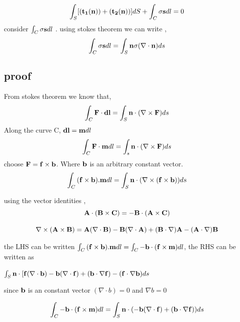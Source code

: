 \documentclass{article}
\begin{document}
\begin{equation}
\label{force balance}
\int_S [{\bf(t_{1}(n))} + {\bf(t_{2}(n))}] dS + \int_C \sigma {\bf s} dl = 0 
\end{equation}
consider $\int_C \sigma {\bf s} dl $ . using stokes theorem we can write ,
\begin{equation}
\int_C \sigma {\bf s} dl = \int_S {\bf n\sigma(\nabla \cdot {\bf n}})ds 
\end{equation}
\subsection*{\bf proof}
From stokes theorem we know that,
\begin{equation*}
\int_C {\bf F \cdot dl} = \int_S {\bf n \cdot (\nabla \times F)}ds
\end{equation*} 
Along the curve C, $ {\bf dl} = {\bf m}dl$
\begin{equation*}
\int_C {\bf F \cdot m}dl = \int_s {\bf n \cdot (\nabla \times F)}ds
\end{equation*}
choose ${\bf F = f \times b}$. Where ${\bf b}$ is an arbitrary constant vector.
\begin{equation*}
\int_C {\bf (f \times b).m}dl = \int_S {\bf n \cdot (\nabla \times (f \times b))} ds
\end{equation*}

using the vector identities ,
\begin{equation}
{\bf A\cdot(B \times C) = -B\cdot(A \times C)}
\end{equation}

\begin{equation}   
{\bf \nabla \times (A\times B) = A(\nabla \cdot B)-B(\nabla \cdot A) + (B \cdot \nabla)A - (A \cdot \nabla)B}
\end{equation}
\newline

the LHS can be written $\int_C {\bf (f \times b).m}dl = \int_C {\bf -b \cdot (f \times m)}dl$, 
the RHS can be written as \newline

$\int_S {\bf n \cdot [f(\nabla \cdot b) - b(\nabla \cdot f) + (b \cdot \nabla f) -(f \cdot \nabla b)}ds$
\newline
 
since ${\bf b}$ is an constant vector  $(\nabla \cdot b) = 0$ and $\nabla b = 0$ 

\begin{equation}
\int_C {\bf -b \cdot (f \times m)}dl = \int_S {\bf n \cdot (-b(\nabla \cdot f) + (b \cdot \nabla f))}ds
\end{equation}
\end{document}
